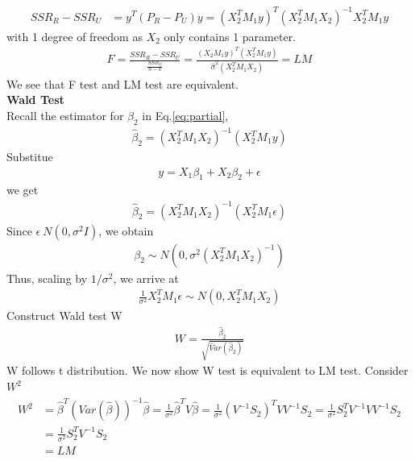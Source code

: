 \documentclass[a4paper]{article}
\begin{document}
\begin{align*}
SSR_R-SSR_U & = y^T(P_R-P_U)y = (X_2^TM_1y)^T(X_2^TM_1X_2)^{-1}X_2^TM_1y
\end{align*}
with 1 degree of freedom as $X_2$ only contains 1 parameter.
\begin{align*}
F = \frac{SSR_R - SSR_U}{\frac{SSR_U}{n-k}} = \frac{(X_2M_1y)^T(X_2^TM_1y)}{\hat \sigma^2 (X_2^TM_1X_2)} =LM
\end{align*}
We see that F test and LM test are equivalent.\\
{\bf Wald Test}\\
Recall the estimator for $\beta_2$ in Eq.\ref{eq:partial},
\begin{align*}
\hat \beta_2  =  (X_2^T  M_1X_2)^{-1}(X_2^T M_1y)  
\end{align*}
Substitue
\begin{align*}
y=X_1\beta_1+X_2\beta_2+\epsilon
\end{align*}
we get
\begin{align*}
\hat \beta_2 =  (X_2^T  M_1X_2)^{-1}(X_2^T M_1\epsilon)  
\end{align*}
Since $\epsilon ~ N(0, \sigma^2I)$, we obtain
\begin{align*}
\beta_2 \sim N(0, \sigma^2(X_2^TM_1X_2)^{-1})
\end{align*}
Thus, scaling by $1/\sigma^2$, we arrive at
\begin{align*}
\frac{1}{\sigma^2}X_2^T M_1\epsilon \sim N(0,X_2^T M_1 X_2 )
\end{align*}
Construct Wald test W
\begin{align*}
W = \frac{\hat \beta_2}{\sqrt{\hat Var(\hat \beta_2)}}
\end{align*}
W follows t distribution. We now show W test is equivalent to LM test. Consider $W^2$
\begin{align*}
W^2 & =\hat \beta^T (Var(\hat \beta))^{-1} \hat \beta = \frac{1}{\sigma^2}\hat \beta^T V \hat \beta = \frac{1}{\sigma^2} (V^{-1}S_2)^T V V^{-1} S_2 =\frac{1}{\sigma^2} S_2^T V^{-1}VV^{-1}S_2 \\ &=  \frac{1}{\sigma^2}S_2^T V^{-1}S_2\\
       &= LM
\end{align*}
\end{document}
